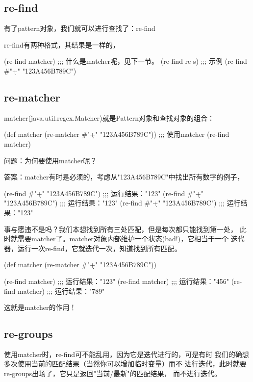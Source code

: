 ﻿\documentclass[a4paper,11pt]{article}
\begin{document}
  \subsection[re-find]{re-find}
  有了pattern对象，我们就可以进行查找了：re-find

  re-find有两种格式，其结果是一样的，

  \begin{schemecode}
(re-find matcher)
;;; 什么是matcher呢，见下一节。
(re-find re s)
;;; 示例
(re-find #"\d+" "123A456B789C")
  \end{schemecode}
  
  \subsection[re-matcher]{re-matcher}
  matcher(java.util.regex.Matcher)就是Pattern对象和查找对象的组合：

  \begin{schemecode}
(def matcher (re-matcher #"\d+" "123A456B789C"))
;;; 使用matcher
(re-find matcher)
  \end{schemecode}

  问题：为何要使用matcher呢？

  答案：matcher有时是必须的，考虑从"123A456B789C"中找出所有数字的例子，

  \begin{schemecode}
(re-find #"\d+" "123A456B789C")
;;; 运行结果："123"
(re-find #"\d+" "123A456B789C")
;;; 运行结果："123"
(re-find #"\d+" "123A456B789C")
;;; 运行结果："123"
  \end{schemecode}

  事与愿违不是吗？我们本想找到所有三处匹配，但是每次都只能找到第一处，
  此时就需要matcher了。matcher对象内部维护一个状态(bad!)，它相当于一个
  迭代器，运行一次re-find，它就迭代一次，知道找到所有匹配。

  \begin{schemecode}
(def matcher (re-matcher #"\d+" "123A456B789C"))

(re-find matcher)
;;; 运行结果："123"
(re-find matcher)
;;; 运行结果："456"
(re-find matcher)
;;; 运行结果："789"
  \end{schemecode}

  这就是matcher的作用！

  \subsection[re-groups]{re-groups}
  使用matcher时，re-find可不能乱用，因为它是迭代进行的，可是有时
  我们的确想多次使用当前的匹配结果（当然你可以增加临时变量）而不
  进行迭代，此时就要re-groups出场了，它只是返回"当前/最新"的匹配结果，
  而不进行迭代。
\end{document}
